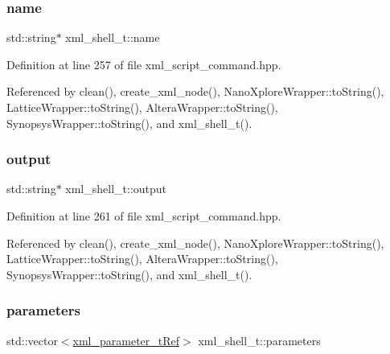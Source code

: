 \subsubsection{\texorpdfstring{name}{name}}
{\footnotesize\ttfamily std\+::string$\ast$ xml\+\_\+shell\+\_\+t\+::name}



Definition at line 257 of file xml\+\_\+script\+\_\+command.\+hpp.



Referenced by clean(), create\+\_\+xml\+\_\+node(), Nano\+Xplore\+Wrapper\+::to\+String(), Lattice\+Wrapper\+::to\+String(), Altera\+Wrapper\+::to\+String(), Synopsys\+Wrapper\+::to\+String(), and xml\+\_\+shell\+\_\+t().

\mbox{\label{classxml__shell__t_a60b9e3f90a51340e2b16e8f2ea089edc}} 
\subsubsection{\texorpdfstring{output}{output}}
{\footnotesize\ttfamily std\+::string$\ast$ xml\+\_\+shell\+\_\+t\+::output}



Definition at line 261 of file xml\+\_\+script\+\_\+command.\+hpp.



Referenced by clean(), create\+\_\+xml\+\_\+node(), Nano\+Xplore\+Wrapper\+::to\+String(), Lattice\+Wrapper\+::to\+String(), Altera\+Wrapper\+::to\+String(), Synopsys\+Wrapper\+::to\+String(), and xml\+\_\+shell\+\_\+t().

\mbox{\label{classxml__shell__t_ae8d69a24e9be3b4c62b029995479695c}} 
\subsubsection{\texorpdfstring{parameters}{parameters}}
{\footnotesize\ttfamily std\+::vector$<$\hyperlink{xml__script__command_8hpp_aec6b63d2a298703bc3ead113609b27a6}{xml\+\_\+parameter\+\_\+t\+Ref}$>$ xml\+\_\+shell\+\_\+t\+::parameters}



